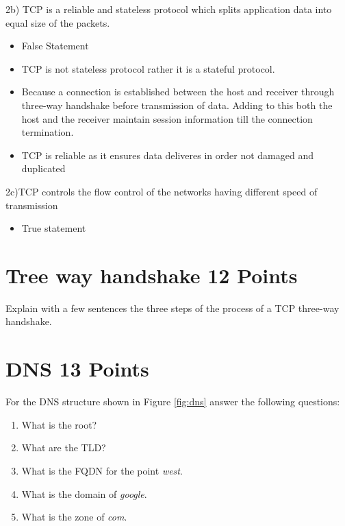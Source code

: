 \documentclass{resources/WeSTassignment}
\begin{document}
2b) TCP is a reliable and stateless protocol which splits application data into equal
size of the packets.
			\begin{itemize}
			\item False Statement
			\item TCP is not stateless protocol rather it is a stateful protocol.
			\item Because a connection is established between the host and receiver through three-way handshake before transmission of data. Adding to this both the host and the receiver maintain session information till the connection termination.
			\item TCP is reliable as it ensures data deliveres in order not damaged and duplicated 
			\end{itemize}
2c)TCP controls the flow control of the networks having different speed of transmission 
			\begin{itemize}
			\item True statement
			\end{itemize}




\section{Tree way handshake \hfill{12 Points}}
Explain with a few sentences the three steps of the process of a TCP three-way handshake.

\section{DNS \hfill{13 Points}}
For the DNS structure shown in Figure \ref{fig:dns} answer the following questions:
\begin{enumerate}
    \item What is the root?
    \item What are the TLD?
    \item What is the FQDN for the point \emph{west}.
    \item What is the domain of \emph{google}.
    \item What is the zone of \emph{com}.
\end{enumerate}
\end{document}
